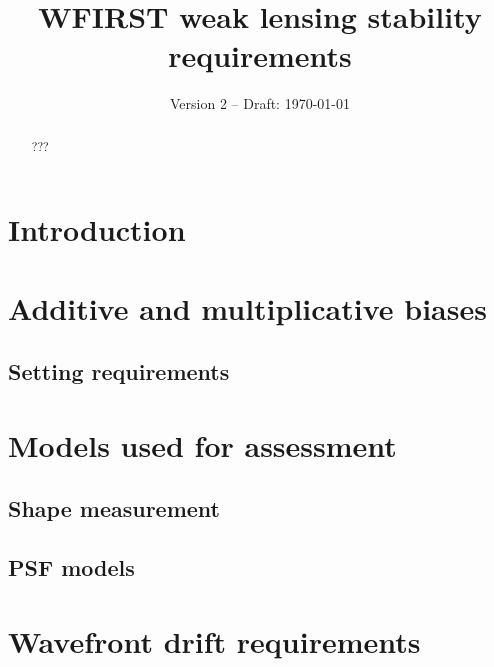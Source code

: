 \documentclass[preprint]{aastex}
\begin{document}
\title{WFIRST weak lensing stability requirements}

\date{Version 2 -- Draft: \today}


\begin{abstract}
???
\end{abstract}


\tableofcontents

\section{Introduction}
\label{sec:intro}


\section{Additive and multiplicative biases}
\label{sec:add_mult}



\subsection{Setting requirements}



\section{Models used for assessment}



\subsection{Shape measurement}
\label{ss:shape}



\subsection{PSF models}
\label{ss:PSF}



\section{Wavefront drift requirements}
\label{sec:drift}
\end{document}
